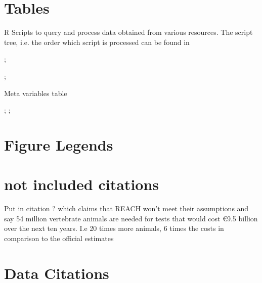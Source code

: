 \documentclass[english]{article}
\begin{document}
\section*{Tables}

\begin{table}
    \caption{R Scripts to query and process data obtained from various resources. The script tree, i.e. the order which script is processed can be found in}
    \label{table:processing-scripts};
\end{table}




\begin{sidewaystable}
    ;
    \caption{Meta variables table};
    \label{table:meta-variables};
\end{sidewaystable}




\section*{Figure Legends}




\section*{not included citations}
Put in citation \citep{hartung_chemical_2009} ? which claims that REACH won't meet their assumptions and say 54 million vertebrate animals are needed for tests that would cost €9.5 billion over the next ten years. I.e 20 times more animals, 6 times the costs in comparison to the official estimates 


\section*{Data Citations}
\end{document}
